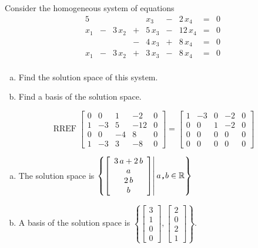 
\begin{exerciseStatement}


Consider the homogeneous system of equations 
\begin{alignat*}{5}  & &  & & x_{3} &-& 2 \, x_{4} &=& 0 \\x_{1} &-& 3 \, x_{2} &+& 5 \, x_{3} &-& 12 \, x_{4} &=& 0 \\ & &  &-& 4 \, x_{3} &+& 8 \, x_{4} &=& 0 \\x_{1} &-& 3 \, x_{2} &+& 3 \, x_{3} &-& 8 \, x_{4} &=& 0 \\ \end{alignat*}
            


\begin{enumerate}[(a)]
\item  Find the solution space of this system.
\item  Find a basis of the solution space.
\end{enumerate}
    
\end{exerciseStatement}
    
\begin{exerciseAnswer} 


\[\operatorname{RREF} \left[\begin{array}{cccc|c}
0 & 0 & 1 & -2 & 0 \\
1 & -3 & 5 & -12 & 0 \\
0 & 0 & -4 & 8 & 0 \\
1 & -3 & 3 & -8 & 0
\end{array}\right] = \left[\begin{array}{cccc|c}
1 & -3 & 0 & -2 & 0 \\
0 & 0 & 1 & -2 & 0 \\
0 & 0 & 0 & 0 & 0 \\
0 & 0 & 0 & 0 & 0
\end{array}\right] \]


\begin{enumerate}[(a)]
\item The solution space is \( \left\{ \left[\begin{array}{c}
3 \, a + 2 \, b \\
a \\
2 \, b \\
b
\end{array}\right] \middle|\,a\text{\texttt{,}}b\in\mathbb{R}\right\} \)
\item A basis of the solution space is \( \left\{ \left[\begin{array}{c}
3 \\
1 \\
0 \\
0
\end{array}\right] , \left[\begin{array}{c}
2 \\
0 \\
2 \\
1
\end{array}\right] \right\} \).
\end{enumerate}
    
\end{exerciseAnswer}
    
